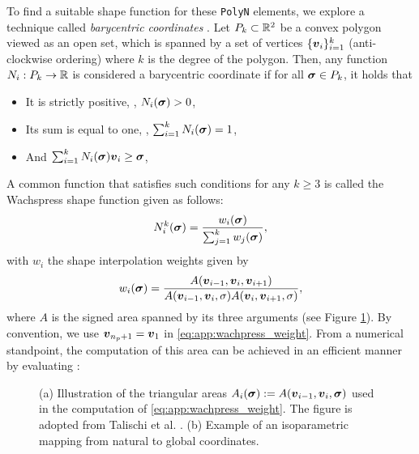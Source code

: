 To find a suitable shape function for these \texttt{PolyN} elements, we explore a technique called \textit{barycentric coordinates} \cite{Floater2014Jun,Floater2015May}. Let $P_k \subset \mathbb{R}^2$ be a convex polygon viewed as an open set, which is spanned by a set of vertices $\{{\boldsymbol{v}}_i\}_{i=1}^k$ (anti-clockwise ordering) where $k$ is the degree of the polygon. Then, any function $N_i: P_k \to \mathbb{R}$ is considered a barycentric coordinate if for all $\boldsymbol{\sigma} \in P_k$, it holds that 
%
\begin{itemize}
    \vspace{-2mm}
    \setlength\itemsep{0.1em}
    \item It is strictly positive, \ie, $N_i(\boldsymbol{\sigma}) > 0$, 
    \item Its sum is equal to one, \ie, $\sum_{i=1}^k N_i(\boldsymbol{\sigma}) = 1$, 
    \item And $\sum_{i=1}^k N_i(\boldsymbol{\sigma}) {\boldsymbol{v}}_i \ge \boldsymbol{\sigma}$, 
\end{itemize}
A common function that satisfies such conditions for any $k \ge 3$ is called the Wachspress shape function given as follows:
%
\begin{equation}
N^k_i(\boldsymbol{\sigma})  = \frac{w_i(\boldsymbol{\sigma})}{\sum_{j=1}^{k} w_j(\boldsymbol{\sigma})},
\label{eq:app:wachpress}
\end{equation}
%
with $w_i$ the shape interpolation weights given by 
%
\begin{equation}
w_i(\boldsymbol{\sigma})  = \frac{A({\boldsymbol{v}}_{i-1}, {\boldsymbol{v}}_{i}, {\boldsymbol{v}}_{i+1})}{A({\boldsymbol{v}}_{i-1}, {\boldsymbol{v}}_{i}, \sigma) A({\boldsymbol{v}}_{i}, {\boldsymbol{v}}_{i+1}, \sigma)},
\label{eq:app:wachpress_weight}
\end{equation}
%
where $A$ is the signed area spanned by its three arguments (see Figure \ref{app:fig:C3:voronoimeshExplain}). By convention, we use ${\boldsymbol{v}}_{n_p + 1} = {\boldsymbol{v}}_1$ in \eqref{eq:app:wachpress_weight}. From a numerical standpoint, the computation of this area can be achieved in an efficient manner by evaluating \cite{Talischi2012Mar}:
\begin{figure}
\centering
\vspace{-5mm}

\caption{(a) Illustration of the triangular areas $A_i(\boldsymbol{\sigma}) := A({\boldsymbol{v}}_{i-1}, {\boldsymbol{v}}_i, \boldsymbol{\sigma})$ used in the computation of \eqref{eq:app:wachpress_weight}. The figure is adopted from Talischi et al. \cite{Talischi2012Mar,Talischi2012}. (b) Example of an isoparametric mapping from natural to global coordinates.\label{app:fig:C3:voronoimeshExplain}}
\vspace{-3mm}
\end{figure}
